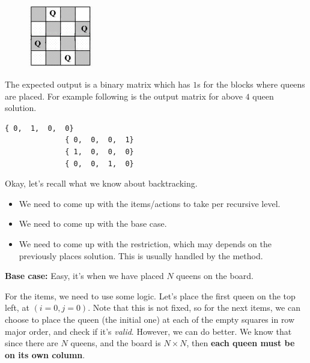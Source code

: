 \begin{figure}
\centering
\includegraphics[width=0.25\textwidth]{Images/figGFGBkTSet3NQueen}
\end{figure}

The expected output is a binary matrix which has $1$s for the blocks where
queens are placed. For example following is the output matrix for above $4$
queen solution.
\begin{lstlisting}[style=raygeneric]
              { 0,  1,  0,  0}
              { 0,  0,  0,  1}
              { 1,  0,  0,  0}
              { 0,  0,  1,  0}
\end{lstlisting}

\textbf{}

\RayNotesBegin

Okay, let's recall what we know about backtracking.
\begin{itemize}[noitemsep,topsep=0pt]
\item We need to come up with the items/actions to take per recursive level.
\item We need to come up with the base case.
\item We need to come up with the restriction, which may depends on the
  previously places solution. This is usually handled by the 
  method.
\end{itemize}

\textbf{Base case:} Easy, it's when we have placed $N$ queens on the board.

For the items, we need to use some logic. Let's place the first queen on the
top left, at $(i=0,j=0)$. Note that this is not fixed, so for the next
items, we can choose to place the queen (the initial one) at each of the
empty squares in row major order, and check if it's \emph{valid}. However,
we can do better. We know that since there are $N$ queens, and the board is
$N\times N$, then \textbf{each queen must be on its own column}.

